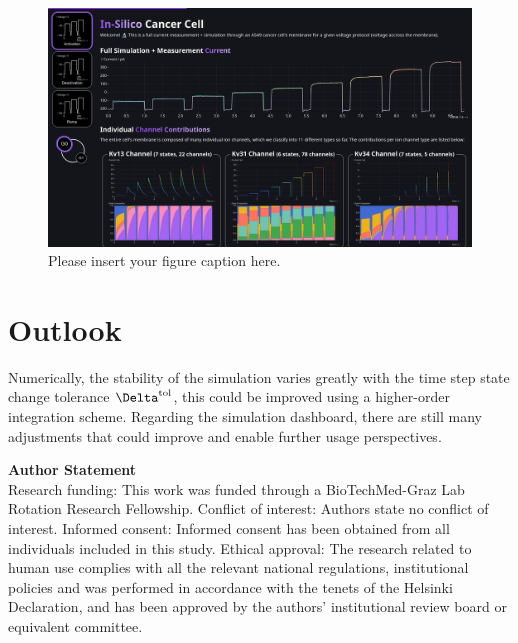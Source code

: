 \documentclass[USenglish,twocolumn]{article}
\begin{document}
  \begin{figure}
    \includegraphics[width=\textwidth]{../figures/above-the-fold-screenshot.png}
    \caption{Please insert your figure caption here.}
    \label{figure:screenshot}
  \end{figure}

  \section{Outlook}
  Numerically, the stability of the simulation varies greatly with the time step state change tolerance $\Delta^{\rm tol}$, this could be improved using a higher-order integration scheme.
  Regarding the simulation dashboard, there are still many adjustments that could improve and enable further usage perspectives.

  \vspace{1cm}


  \textsf{\textbf{Author Statement}}\\
  Research funding: This work was funded through a BioTechMed-Graz Lab Rotation Research Fellowship.
  Conflict of interest: Authors state no conflict of interest.
  Informed consent: Informed consent has been obtained from all individuals included in this study.
  Ethical approval: The research related to human use complies with all the relevant national regulations, institutional policies and was performed in accordance with the tenets of the Helsinki Declaration, and has been approved by the authors' institutional review board or equivalent committee.

  \printbibliography
\end{document}

